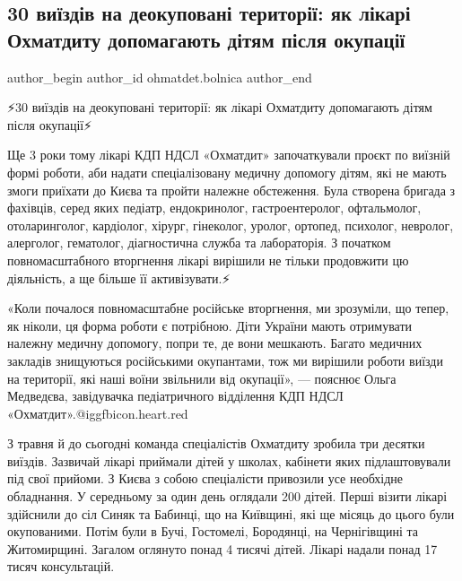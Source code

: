  
 
 
 
 
 
\subsection{30 виїздів на деокуповані території: як лікарі Охматдиту допомагають дітям після окупації}
\label{sec:13_12_2022.fb.ohmatdet.bolnica.1.vyizdy}
 
\ifcmt
 author_begin
   author_id ohmatdet.bolnica
 author_end
\fi

⚡️30 виїздів на деокуповані території: як лікарі Охматдиту допомагають дітям після окупації⚡️

Ще 3 роки тому лікарі КДП НДСЛ «Охматдит» започаткували проєкт по виїзній формі
роботи, аби надати спеціалізовану медичну допомогу дітям, які не мають змоги
приїхати до Києва та пройти належне обстеження. Була створена бригада з
фахівців, серед яких педіатр, ендокринолог, гастроентеролог, офтальмолог,
отоларинголог, кардіолог, хірург, гінеколог, уролог, ортопед, психолог,
невролог, алерголог, гематолог, діагностична служба та лабораторія. З початком
повномасштабного вторгнення лікарі вирішили не тільки продовжити цю діяльність,
а ще більше її активізувати.⚡️

«Коли почалося повномасштабне російське вторгнення, ми зрозуміли, що тепер, як
ніколи, ця форма роботи є потрібною. Діти України мають отримувати належну
медичну допомогу, попри те, де вони мешкають. Багато медичних закладів
знищуються російськими окупантами, тож ми вирішили роботи виїзди на території,
які наші воїни звільнили від окупації», — пояснює Ольга Медведєва, завідувачка
педіатричного відділення КДП НДСЛ «Охматдит».@igg{fbicon.heart.red}


З травня й до сьогодні команда спеціалістів Охматдиту зробила три десятки
виїздів. Зазвичай лікарі приймали дітей у школах, кабінети яких підлаштовували
під свої прийоми. З Києва з собою спеціалісти привозили усе необхідне
обладнання. У середньому за один день оглядали 200 дітей. Перші візити лікарі
здійснили до сіл Синяк та Бабинці, що на Київщині, які ще місяць до цього були
окупованими. Потім були в Бучі, Гостомелі, Бородянці, на Чернігівщині та
Житомирщині. Загалом оглянуто понад 4 тисячі дітей. Лікарі надали понад 17
тисяч консультацій.🙌🏻

